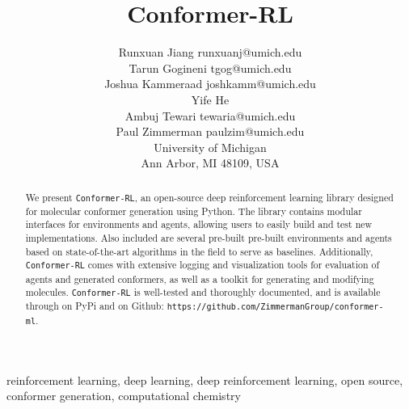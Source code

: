 \documentclass[twoside,11pt]{article}
\newcommand{\code}[1]{\texttt{#1}}
\newcommand{\titleofpaper}{Conformer-RL}
\begin{document}
\title{\titleofpaper}

\author{\name Runxuan Jiang \email runxuanj@umich.edu \\
       \name Tarun Gogineni \email tgog@umich.edu \\
       \name Joshua Kammeraad \email joshkamm@umich.edu\\
       \name  Yife He \\
       \name Ambuj Tewari \email tewaria@umich.edu\\
       \name Paul Zimmerman \email paulzim@umich.edu\\
       \addr
       University of Michigan\\
       Ann Arbor, MI 48109, USA} 

\maketitle

\begin{abstract}%
  We present \code{\titleofpaper}, an open-source deep reinforcement learning library designed for molecular conformer generation using Python. The library contains modular interfaces for environments and agents, allowing users to easily build and test new implementations. Also included are several pre-built pre-built environments and agents based on state-of-the-art algorithms in the field to serve as baselines. Additionally, \code{\titleofpaper} comes with extensive logging and visualization tools for evaluation of agents and generated conformers, as well as a toolkit for generating and modifying molecules. \code{\titleofpaper} is well-tested and thoroughly documented, and is available through on PyPi and on Github: \code{https://github.com/ZimmermanGroup/conformer-ml}.
\end{abstract}

\begin{keywords}
  reinforcement learning, deep learning, deep reinforcement learning, open source, conformer generation, computational chemistry
\end{keywords}
\end{document}
